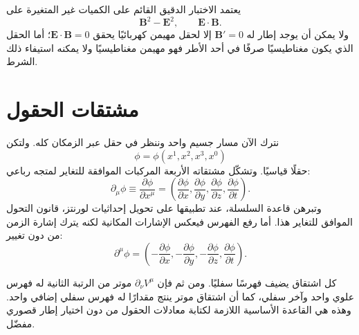 يعتمد الاختبار الدقيق القائم على الكميات غير المتغيرة على
\begin{equation}
  \boldsymbol B^2-\boldsymbol E^2,
  \qquad
  \boldsymbol E\cdot\boldsymbol B.
\end{equation}
ولا يمكن أن يوجد إطار له \(\boldsymbol B'=0\) إلا لحقل مهيمن كهربائيًا يحقق \(\boldsymbol E\cdot\boldsymbol B=0\)؛ أما الحقل الذي يكون مغناطيسيًا صرفًا في أحد الأطر فهو مهيمن مغناطيسيًا ولا يمكنه استيفاء ذلك الشرط.

\begin{classroomqa}
\end{classroomqa}

\section{مشتقات الحقول}

نترك الآن مسار جسيم واحد وننظر في حقل عبر الزمكان كله. ولتكن
\begin{equation}
  \phi=\phi(x^1,x^2,x^3,x^0)
\end{equation}
حقلًا قياسيًا. وتشكّل مشتقاته الأربعة المركبات الموافقة للتغاير لمتجه رباعي:
\begin{equation}
  \partial_\mu\phi
  \equiv\frac{\partial\phi}{\partial x^\mu}
  =\left(
    \frac{\partial\phi}{\partial x},
    \frac{\partial\phi}{\partial y},
    \frac{\partial\phi}{\partial z},
    \frac{\partial\phi}{\partial t}
  \right).
\end{equation}
وتبرهن قاعدة السلسلة، عند تطبيقها على تحويل إحداثيات لورنتز، قانون التحول الموافق للتغاير هذا. أما رفع الفهرس فيعكس الإشارات المكانية لكنه يترك إشارة الزمن من دون تغيير:
\begin{equation}
  \partial^\mu\phi
  =\left(
    -\frac{\partial\phi}{\partial x},
    -\frac{\partial\phi}{\partial y},
    -\frac{\partial\phi}{\partial z},
    \frac{\partial\phi}{\partial t}
  \right).
\end{equation}

كل اشتقاق يضيف فهرسًا سفليًا. ومن ثم فإن \(\partial_\nu V^\mu\) موتر من الرتبة الثانية له فهرس علوي واحد وآخر سفلي، كما أن اشتقاق موتر ينتج مقدارًا له فهرس سفلي إضافي واحد. وهذه هي القاعدة الأساسية اللازمة لكتابة معادلات الحقول من دون اختيار إطار قصوري مفضّل.

